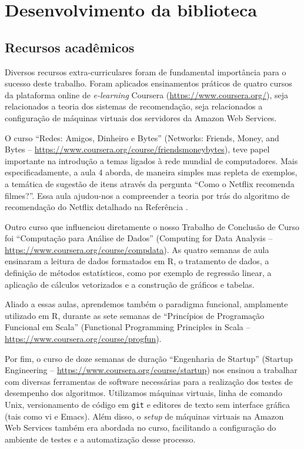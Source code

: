 \chapter{Desenvolvimento da biblioteca} %
\label{cha:desenvolvimento_da_biblioteca}

\section{Recursos acadêmicos} %
\label{sec:recursos_acad_micos}

Diversos recursos extra-curriculares foram de fundamental importância para o sucesso deste trabalho. Foram aplicados ensinamentos práticos de quatro cursos da plataforma online de \textit{e-learning} Coursera (\url{https://www.coursera.org/}), seja relacionados a teoria dos sistemas de recomendação, seja relacionados a configuração de máquinas virtuais dos servidores da Amazon Web Services.

O curso ``Redes: Amigos, Dinheiro e Bytes'' (Networks: Friends, Money, and Bytes -- \url{https://www.coursera.org/course/friendsmoneybytes}), teve papel importante na introdução a temas ligados à rede mundial de computadores. Mais especificadamente, a aula 4 aborda, de maneira simples mas repleta de exemplos, a temática de sugestão de itens através da pergunta ``Como o Netflix recomenda filmes?''. Essa aula ajudou-nos a compreender a teoria por trás do algoritmo de recomendação do Netflix detalhado na Referência .


Outro curso que influenciou diretamente o nosso Trabalho de Conclusão de Curso foi ``Computação para Análise de Dados'' (Computing for Data Analysis -- \url{https://www.coursera.org/course/compdata}). As quatro semanas de aula ensinaram a leitura de dados formatados em R, o tratamento de dados, a definição de métodos estatísticos, como por exemplo de regressão linear, a aplicação de cálculos vetorizados e a construção de gráficos e tabelas. 

Aliado a essas aulas, aprendemos também o paradigma funcional, amplamente utilizado em R, durante as sete semanas de ``Princípios de Programação Funcional em Scala'' (Functional Programming Principles in Scala -- \url{https://www.coursera.org/course/progfun}).

Por fim, o curso de doze semanas de duração ``Engenharia de Startup'' (Startup Engineering -- \url{https://www.coursera.org/course/startup}) nos ensinou a trabalhar com diversas ferramentas de software necessárias para a realização dos testes de desempenho dos algoritmos. Utilizamos máquinas virtuais, linha de comando Unix, versionamento de código em \texttt{git} e editores de texto sem interface gráfica (tais como vi e Emacs). Além disso, o \textit{setup} de máquinas virtuais na Amazon Web Services também era abordada no curso, facilitando a configuração do ambiente de testes e a automatização desse processo. 

